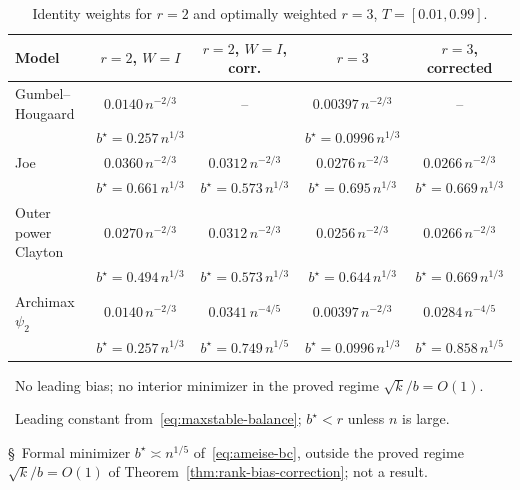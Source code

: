 \begin{table}[t]
\centering
\small
\caption{Identity weights for $r=2$ and optimally weighted $r=3$, $T=[0.01,0.99]$.}
\label{tab:comparison-supp}
\begin{tabular}{lcccc}
\toprule
Model & $r=2$, $W=I$ & $r=2$, $W=I$, corr. & $r=3$ & $r=3$, corrected\\
\midrule
Gumbel--Hougaard & $0.0140\,n^{-2/3}$\rlap{\,\textsuperscript{\ddag}} & --\rlap{\,\textsuperscript{\dag}} & $0.00397\,n^{-2/3}$\rlap{\,\textsuperscript{\ddag}} & --\rlap{\,\textsuperscript{\dag}}\\
 & $\scriptstyle b^\star=0.257\,n^{1/3}$ &  & $\scriptstyle b^\star=0.0996\,n^{1/3}$ & \\[2pt]
Joe & $0.0360\,n^{-2/3}$ & $0.0312\,n^{-2/3}$ & $0.0276\,n^{-2/3}$ & $0.0266\,n^{-2/3}$\\
 & $\scriptstyle b^\star=0.661\,n^{1/3}$ & $\scriptstyle b^\star=0.573\,n^{1/3}$ & $\scriptstyle b^\star=0.695\,n^{1/3}$ & $\scriptstyle b^\star=0.669\,n^{1/3}$\\[2pt]
Outer power Clayton & $0.0270\,n^{-2/3}$ & $0.0312\,n^{-2/3}$ & $0.0256\,n^{-2/3}$ & $0.0266\,n^{-2/3}$\\
 & $\scriptstyle b^\star=0.494\,n^{1/3}$ & $\scriptstyle b^\star=0.573\,n^{1/3}$ & $\scriptstyle b^\star=0.644\,n^{1/3}$ & $\scriptstyle b^\star=0.669\,n^{1/3}$\\[2pt]
Archimax $\psi_2$ & $0.0140\,n^{-2/3}$\rlap{\,\textsuperscript{\ddag}} & $0.0341\,n^{-4/5}$\rlap{\,\textsuperscript{\S}} & $0.00397\,n^{-2/3}$\rlap{\,\textsuperscript{\ddag}} & $0.0284\,n^{-4/5}$\rlap{\,\textsuperscript{\S}}\\
 & $\scriptstyle b^\star=0.257\,n^{1/3}$ & $\scriptstyle b^\star=0.749\,n^{1/5}$ & $\scriptstyle b^\star=0.0996\,n^{1/3}$ & $\scriptstyle b^\star=0.858\,n^{1/5}$\\[2pt]
\bottomrule
\end{tabular}

\smallskip
{\footnotesize
\dag~No leading bias; no interior minimizer in the proved regime $\sqrt{k}/b=O(1)$.\par
\ddag~Leading constant from~\eqref{eq:maxstable-balance}; $b^\star<r$ unless $n$ is large.\par
\S~Formal minimizer $b^\star\asymp n^{1/5}$ of~\eqref{eq:ameise-bc}, outside the
proved regime $\sqrt{k}/b=O(1)$ of Theorem~\ref{thm:rank-bias-correction}; not a result.}
\end{table}
